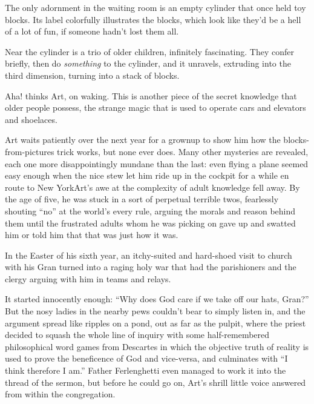 The only adornment in the waiting room is an empty cylinder that
once held toy blocks. Its label colorfully illustrates the blocks,
which look like they’d be a hell of a lot of fun, if someone hadn’t
lost them all.

Near the cylinder is a trio of older children, infinitely
fascinating. They confer briefly, then do \emph{something} to the
cylinder, and it unravels, extruding into the third dimension,
turning into a stack of blocks.

Aha! thinks Art, on waking. This is another piece of the secret
knowledge that older people possess, the strange magic that is used
to operate cars and elevators and shoelaces.

Art waits patiently over the next year for a grownup to show him
how the blocks-from-pictures trick works, but none ever does. Many
other mysteries are revealed, each one more disappointingly mundane
than the last: even flying a plane seemed easy enough when the nice
stew let him ride up in the cockpit for a while en route to New
York{\dash}Art’s awe at the complexity of adult knowledge fell away. By
the age of five, he was stuck in a sort of perpetual terrible twos,
fearlessly shouting “no” at the world’s every rule, arguing the
morals and reason behind them until the frustrated adults whom he
was picking on gave up and swatted him or told him that that was
just how it was.

In the Easter of his sixth year, an itchy-suited and hard-shoed
visit to church with his Gran turned into a raging holy war that
had the parishioners and the clergy arguing with him in teams and
relays.

It started innocently enough: “Why does God care if we take off our
hats, Gran?” But the nosy ladies in the nearby pews couldn’t bear
to simply listen in, and the argument spread like ripples on a
pond, out as far as the pulpit, where the priest decided to squash
the whole line of inquiry with some half-remembered philosophical
word games from Descartes in which the objective truth of reality
is used to prove the beneficence of God and vice-versa, and
culminates with “I think therefore I am.” Father Ferlenghetti even
managed to work it into the thread of the sermon, but before he
could go on, Art’s shrill little voice answered from within the
congregation.

